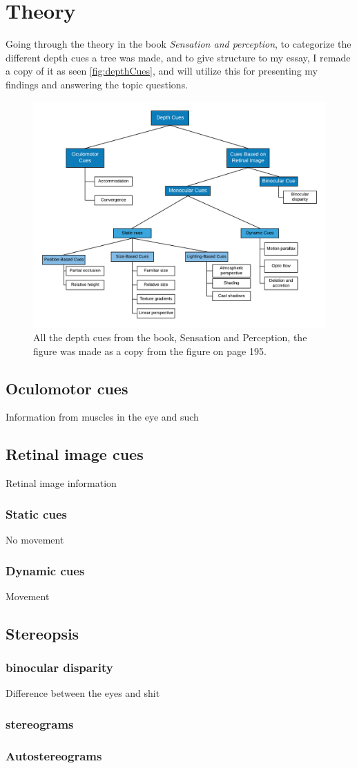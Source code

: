 \section{Theory}
	Going through the theory in the book \textit{Sensation and perception}, to categorize the different depth cues a tree was made, and to give structure to my essay, I remade a copy of it as seen \autoref{fig:depthCues}, and will utilize this for presenting my findings and answering the topic questions.
	\begin{figure}[H]
		\centering
		\includegraphics[width=1\linewidth]{figure/depthcues}
		\caption{All the depth cues from the book, Sensation and Perception\citep{sensationPerception}, the figure was made as a copy from the figure on page 195.}
		\label{fig:depthCues}
	\end{figure}
	\subsection{Oculomotor cues}
		Information from muscles in the eye and such
	\subsection{Retinal image cues}
		Retinal image information
		\subsubsection{Static cues}
			No movement
		\subsubsection{Dynamic cues}
			Movement
	\subsection{Stereopsis}
		
		\subsubsection{binocular disparity}
		Difference between the eyes and shit
		
		\subsubsection*{stereograms}
		
		\subsubsection*{Autostereograms}